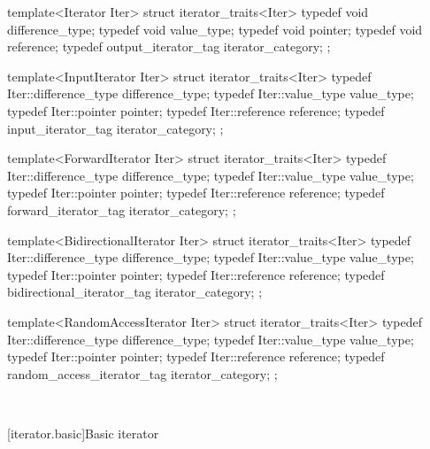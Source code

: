\documentclass[american,twoside]{book}
\begin{document}
\setcounter{Paras}{5}
\pnum
{}
\color{ccadd}
\begin{codeblock}
template<Iterator Iter> struct iterator_traits<Iter> {
  typedef void                             difference_type;
  typedef void                             value_type;
  typedef void                             pointer;
  typedef void                             reference;
  typedef output_iterator_tag              iterator_category;
};

template<InputIterator Iter> struct iterator_traits<Iter> {
  typedef Iter::difference_type            difference_type;
  typedef Iter::value_type                 value_type;
  typedef Iter::pointer                    pointer;
  typedef Iter::reference                  reference;
  typedef input_iterator_tag                   iterator_category;
};

template<ForwardIterator Iter> struct iterator_traits<Iter> {
  typedef Iter::difference_type            difference_type;
  typedef Iter::value_type                 value_type;
  typedef Iter::pointer                    pointer;
  typedef Iter::reference                  reference;
  typedef forward_iterator_tag                 iterator_category;
};

template<BidirectionalIterator Iter> struct iterator_traits<Iter> {
  typedef Iter::difference_type            difference_type;
  typedef Iter::value_type                 value_type;
  typedef Iter::pointer                    pointer;
  typedef Iter::reference                  reference;
  typedef bidirectional_iterator_tag       iterator_category;
};

template<RandomAccessIterator Iter> struct iterator_traits<Iter> {
  typedef Iter::difference_type            difference_type;
  typedef Iter::value_type                 value_type;
  typedef Iter::pointer                    pointer;
  typedef Iter::reference                  reference;
  typedef random_access_iterator_tag       iterator_category;
};
\end{codeblock} 
\exitnote\
\color{black}

[iterator.basic]{Basic iterator}
\end{document}
